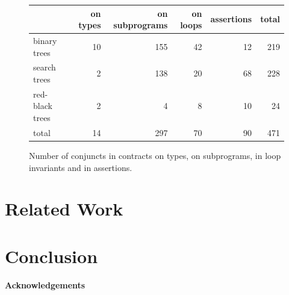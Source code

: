 \documentclass[11pt,a4paper]{article}
\begin{document}
\begin{figure}[ht]
\begin{center}
\begin{tabular}{l|rrrr|r}
                & on types & on subprograms & on loops & assertions & total \\ \hline
binary trees    & 10       & 155            & 42       & 12         & 219 \\
search trees    & 2        & 138            & 20       & 68         & 228 \\
red-black trees & 2        & 4              & 8        & 10         & 24 \\ \hline
total           & 14       & 297            & 70       & 90         & 471
\end{tabular}
\caption{\label{tab-sloc2} Number of conjuncts in contracts on types, on subprograms, in loop invariants and in assertions.}
\end{center}
\end{figure}


\section{Related Work}
\label{related-work}

\section{Conclusion}


\paragraph*{Acknowledgements}




\end{document}
